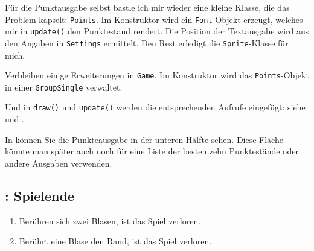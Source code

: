 Für die Punktausgabe selbst bastle ich mir wieder eine kleine Klasse, die das Problem kapselt: \texttt{Points}. Im Konstruktor wird ein \texttt{Font}-Objekt erzeugt, welches mir in \texttt{update()} den Punktestand rendert. Die Position der Textausgabe wird aus den Angaben in \texttt{Settings} ermittelt. Den Rest erledigt die \texttt{Sprite}-Klasse für mich.


Verbleiben einige Erweiterungen in \texttt{Game}. Im Konstruktor wird das \texttt{Points}-Objekt in einer \texttt{GroupSingle} verwaltet.


Und in \texttt{draw()} und \texttt{update()} werden die entsprechenden Aufrufe eingefügt: siehe  und .


In  können Sie die Punkteausgabe in der unteren Hälfte sehen. Diese Fläche könnte man später auch noch für eine Liste der besten zehn Punktestände oder andere Ausgaben verwenden.





\subsection{: Spielende}
\begin{enumerate}
	\item Berühren sich zwei Blasen, ist das Spiel verloren.\label{reqSpielendeBlase}
	\item Berührt eine Blase den Rand, ist das Spiel verloren.\label{reqSpielendeRand}
\end{enumerate}
\er

